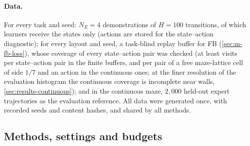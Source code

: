 \paragraph{Data.}
For every task and seed: $N_E=4$ demonstrations of $H=100$ transitions, of which learners receive the states only (actions are stored for the state--action diagnostic); for every layout and seed, a task-blind replay buffer for FB (\cref{sec:m-fb-loss}), whose coverage of every state--action pair was checked (at least  visits per state--action pair in the finite buffers, and  per pair of a free maze-lattice cell of side $1/7$ and an action in the continuous ones; at the finer resolution of the evaluation histogram the continuous coverage is incomplete near walls, \cref{sec:results-continuous}); and in the continuous maze, $2{,}000$ held-out expert trajectories as the evaluation reference.
All data were generated once, with recorded seeds and content hashes, and shared by all methods.

\subsection{Methods, settings and budgets}

